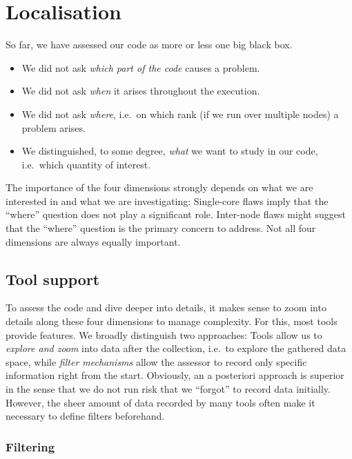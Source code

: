\section{Localisation}
\label{section:workflow:localisation}

So far, we have assessed our code as more or less one big black box.

\begin{itemize}
  \item We did not ask \emph{which part of the code} causes a problem. 
  \item We did not ask \emph{when} it arises throughout the execution.
  \item We did not ask \emph{where}, i.e.~on which rank (if we run over multiple
  nodes) a problem arises.
  \item We distinguished, to some degree, \emph{what} we want to study in our
  code, i.e.~which quantity of interest.
\end{itemize}


\noindent
The importance of the four dimensions strongly depends on what we are interested in and what we are investigating:
Single-core flaws imply that the ``where'' question does not play a significant role.
Inter-node flaws might suggest that the ``where'' question is the primary concern to address.
Not all four dimensions are always equally important.


\subsection{Tool support}

To assess the code and dive deeper into details, it makes sense to zoom into details along these four dimensions to manage complexity.
For this, most tools provide features. 
We broadly distinguish two approaches:
Tools allow us to \emph{explore and zoom} into data after the collection, i.e.~to explore the gathered data space, while \emph{filter mechanisms} allow the assessor to record only specific information right from the start.
Obviously, an a posteriori approach is superior in the sense that we do not run risk that we ``forgot'' to record data initially.
However, the sheer amount of data recorded by many tools often make it necessary to define filters beforehand.

\subsubsection{Filtering}

